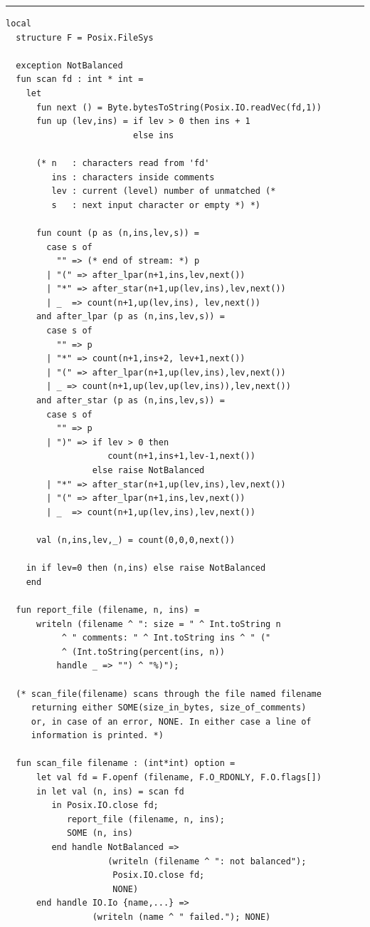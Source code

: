 \documentclass[12pt]{book}
\begin{document}
\bigskip
\hrule
\begin{verbatim}
local
  structure F = Posix.FileSys

  exception NotBalanced
  fun scan fd : int * int =
    let
      fun next () = Byte.bytesToString(Posix.IO.readVec(fd,1))
      fun up (lev,ins) = if lev > 0 then ins + 1
                         else ins

      (* n   : characters read from 'fd'
         ins : characters inside comments
         lev : current (level) number of unmatched (*
         s   : next input character or empty *) *)

      fun count (p as (n,ins,lev,s)) =
        case s of
          "" => (* end of stream: *) p
        | "(" => after_lpar(n+1,ins,lev,next())
        | "*" => after_star(n+1,up(lev,ins),lev,next())
        | _  => count(n+1,up(lev,ins), lev,next())
      and after_lpar (p as (n,ins,lev,s)) =
        case s of
          "" => p
        | "*" => count(n+1,ins+2, lev+1,next())
        | "(" => after_lpar(n+1,up(lev,ins),lev,next())
        | _ => count(n+1,up(lev,up(lev,ins)),lev,next())
      and after_star (p as (n,ins,lev,s)) =
        case s of
          "" => p
        | ")" => if lev > 0 then
                    count(n+1,ins+1,lev-1,next())
                 else raise NotBalanced
        | "*" => after_star(n+1,up(lev,ins),lev,next())
        | "(" => after_lpar(n+1,ins,lev,next())
        | _  => count(n+1,up(lev,ins),lev,next())

      val (n,ins,lev,_) = count(0,0,0,next())

    in if lev=0 then (n,ins) else raise NotBalanced
    end

  fun report_file (filename, n, ins) =
      writeln (filename ^ ": size = " ^ Int.toString n
	       ^ " comments: " ^ Int.toString ins ^ " ("
	       ^ (Int.toString(percent(ins, n))
		  handle _ => "") ^ "%)");

  (* scan_file(filename) scans through the file named filename
     returning either SOME(size_in_bytes, size_of_comments)
     or, in case of an error, NONE. In either case a line of
     information is printed. *)

  fun scan_file filename : (int*int) option =
      let val fd = F.openf (filename, F.O_RDONLY, F.O.flags[])
      in let val (n, ins) = scan fd
         in Posix.IO.close fd;
            report_file (filename, n, ins);
            SOME (n, ins)
         end handle NotBalanced =>
                    (writeln (filename ^ ": not balanced");
                     Posix.IO.close fd;
                     NONE)
      end handle IO.Io {name,...} =>
                 (writeln (name ^ " failed."); NONE)


\end{verbatim}
\end{document}
